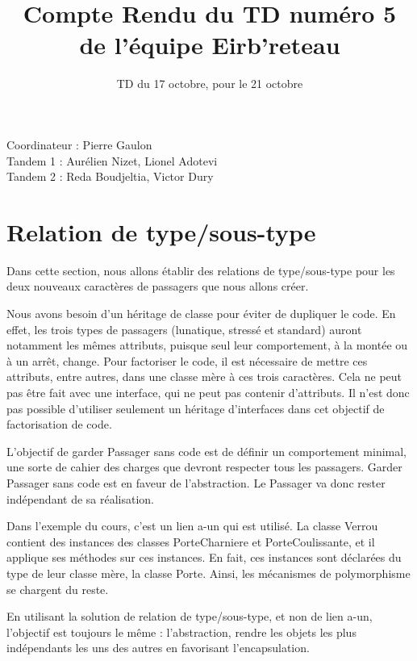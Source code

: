 \documentclass[a4paper,11pt]{article}
\begin{document}
\title{Compte Rendu du TD numéro 5 de l'équipe Eirb'reteau}
\date{TD du 17 octobre, pour le 21 octobre}
\maketitle

\begin{center}
  Coordinateur :  Pierre Gaulon\\
  Tandem 1 : Aurélien Nizet, Lionel Adotevi\\
  Tandem 2 : Reda Boudjeltia, Victor Dury\\
\end{center}

\section{Relation de type/sous-type}
Dans cette section, nous allons établir des relations de type/sous-type pour les deux nouveaux caractères de passagers que nous allons créer.

Nous avons besoin d'un héritage de classe pour éviter de dupliquer le code. En effet, les trois types de passagers (lunatique, stressé et standard) auront notamment les mêmes attributs, puisque seul leur comportement, à la montée ou à un arrêt, change. Pour factoriser le code, il est nécessaire de mettre ces attributs, entre autres, dans une classe mère à ces trois caractères. Cela ne peut pas être fait avec une interface, qui ne peut pas contenir d'attributs. Il n'est donc pas possible d'utiliser seulement un héritage d'interfaces dans cet objectif de factorisation de code.

L'objectif de garder Passager sans code est de définir un comportement minimal, une sorte de cahier des charges que devront respecter tous les passagers. Garder Passager sans code est en faveur de l'abstraction. Le Passager va donc rester indépendant de sa réalisation.

Dans l'exemple du cours, c'est un lien a-un qui est utilisé. La classe Verrou contient des instances des classes PorteCharniere et PorteCoulissante, et il applique ses méthodes sur ces instances. En fait, ces instances sont déclarées du type de leur classe mère, la classe Porte. Ainsi, les mécanismes de polymorphisme se chargent du reste.

En utilisant la solution de relation de type/sous-type, et non de lien a-un, l'objectif est toujours le même : l'abstraction, rendre les objets les plus indépendants les uns des autres en favorisant l'encapsulation.
\end{document}
